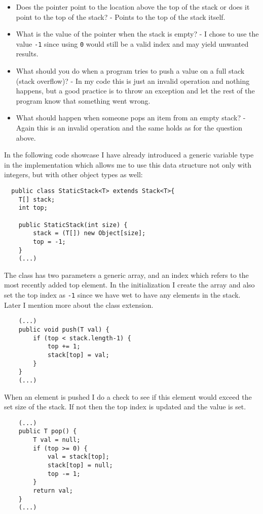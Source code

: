\documentclass[a4paper,11pt]{article}
\begin{document}
\begin{itemize}
\item Does the pointer point to the location above the top of the stack or
does it point to the top of the stack? - Points to the top of the stack itself.
\item What is the value of the pointer when the stack is empty? - I chose to use the value {\tt -1} since using {\tt 0} would still be a valid index and may yield unwanted results.
\item What should you do when a program tries to push a value on a full
stack (stack overflow)? - In my code this is just an invalid operation and nothing happens, but a good practice is to throw an exception and let the rest of the program know that something went wrong.
\item What should happen when someone pops an item from an empty
stack? - Again this is an invalid operation and the same holds as for the question above.
\end{itemize} 

In the following code showcase I have already introduced a generic variable type in the implementation which allows me to use this data structure not only with integers, but with other object types as well:

\begin{verbatim}
  public class StaticStack<T> extends Stack<T>{
    T[] stack;
    int top;

    public StaticStack(int size) {
        stack = (T[]) new Object[size];
        top = -1;
    }
    (...)
\end{verbatim}   

The class has two parameters a generic array, and an index which refers to the most recently added top element. In the initialization I create the array and also set the top index as {\tt -1} since we have wet to have any elements in the stack. Later I mention more about the class extension. 
\begin{verbatim}
    (...)
    public void push(T val) {
        if (top < stack.length-1) {
            top += 1;
            stack[top] = val;
        }
    }
    (...)
\end{verbatim}   

When an element is pushed I do a check to see if this element would exceed the set size of the stack. If not then the top index is updated and the value is set.
\begin{verbatim}
    (...)
    public T pop() {
        T val = null;
        if (top >= 0) {
            val = stack[top];
            stack[top] = null;
            top -= 1;
        }
        return val;
    }
    (...)
\end{verbatim}
\end{document}
